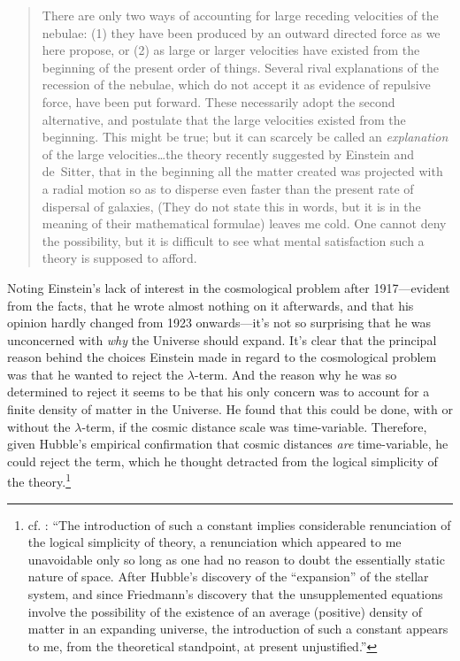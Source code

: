 \documentclass[12 pt]{article}
\begin{document}
\begin{quote}
There are only two ways of accounting for large receding velocities of the nebulae: (1) they have been produced by an outward directed force as we here propose, or (2) as large or larger velocities have existed from the beginning of the present order of things. Several rival explanations of the recession of the nebulae, which do not accept it as evidence of repulsive force, have been put forward. These necessarily adopt the second alternative, and postulate that the large velocities existed from the beginning. This might be true; but it can scarcely be called an \textit{explanation} of the large velocities\ldots the theory recently suggested by Einstein and de~Sitter, that in the beginning all the matter created was projected with a radial motion so as to disperse even faster than the present rate of dispersal of galaxies, \*(They do not state this in words, but it is in the meaning of their mathematical formulae) leaves me cold. One cannot deny the possibility, but it is difficult to see what mental satisfaction such a theory is supposed to afford.
\end{quote}

Noting Einstein's lack of interest in the cosmological problem after 1917---evident from the facts, that he wrote almost nothing on it afterwards, and that his opinion hardly changed from 1923 onwards---it's not so surprising that he was unconcerned with \textit{why} the Universe should expand. It's clear that the principal reason behind the choices Einstein made in regard to the cosmological problem was that he wanted to reject the $\lambda$-term. And the reason why he was so determined to reject it seems to be that his only concern was to account for a finite density of matter in the Universe. He found that this could be done, with or without the $\lambda$-term, if the cosmic distance scale was time-variable. Therefore, given Hubble's empirical confirmation that cosmic distances \textit{are} time-variable, he could reject the term, which he thought detracted from the logical simplicity of the theory.\footnote{cf. \citet[p.~684-685]{Einstein1949}: ``The introduction of such a constant implies considerable renunciation of the logical simplicity of theory, a renunciation which appeared to me unavoidable only so long as one had no reason to doubt the essentially static nature of space. After Hubble's discovery of the ``expansion'' of the stellar system, and since Friedmann's discovery that the unsupplemented equations involve the possibility of the existence of an average (positive) density of matter in an expanding universe, the introduction of such a constant appears to me, from the theoretical standpoint, at present unjustified.''}
\end{document}
